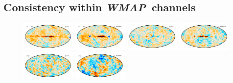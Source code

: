 \documentclass[twocolumn]{../../common/aa}
\def\WMAP{\emph{WMAP}}
\begin{document}
\subsection{Consistency within \WMAP\ channels}
\label{sec:internal_consistency}

\begin{figure}
	\centering
	\includegraphics[width=0.24\textwidth]{figures/KKa_deltaQ.pdf}
	\includegraphics[width=0.24\textwidth]{figures/KKa_W_deltaQ.pdf}
	\includegraphics[width=0.24\textwidth]{figures/KKa_deltaU.pdf}
	\includegraphics[width=0.24\textwidth]{figures/KKa_W_deltaU.pdf}\\
	\includegraphics[width=0.24\textwidth]{figures/Q_deltaQ.pdf}
	\includegraphics[width=0.24\textwidth]{figures/Q_W_deltaQ.pdf}

\end{figure}
\end{document}
